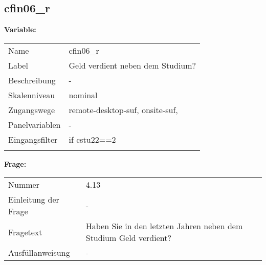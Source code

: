 	
	
	\subsection{cfin06\_r}
	\label{subSection:cfin06_r}

	\noindent\textbf{Variable:}\\
		\begin{tabular}{lL{11.3cm}}
			\label{tableVariable:cfin06_r}
			Name & cfin06\_r \\
			Label & Geld verdient neben dem Studium? \\
			Beschreibung & - \\
			Skalenniveau & nominal \\
			Zugangswege &
				remote-desktop-suf,
				onsite-suf,
 \\
			Panelvariablen & -
			 \\
			Eingangsfilter & if cstu22==2 \\
 \\
		\end{tabular}

		\vspace*{1 cm}
		\noindent\textbf{Frage:}\\
		\begin{tabular}{lL{11.3cm}}
			\label{tableQuestion:cfin06_r}
			Nummer & 4.13 \\
			Einleitung der Frage & - \\
			Fragetext & Haben Sie in den letzten Jahren neben dem Studium Geld verdient? \\
			Ausfüllanweisung & - \\
		\end{tabular}





